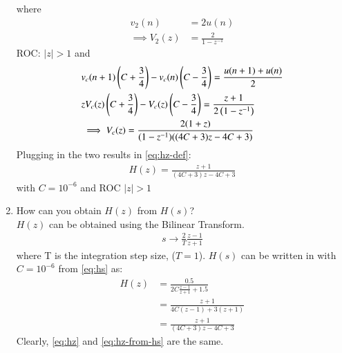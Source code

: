 \documentclass[journal,12pt,twocolumn]{IEEEtran}
\renewcommand\thesection{\arabic{section}}
\begin{document}
\begin{enumerate}[label=\arabic*.,ref=\thesection.\theenumi]
	where
	\begin{align}
	    v_2(n) &= 2u(n)\\
	    \implies V_2(z) &= \frac{2}{1-z^{-1}}
	\end{align}
	ROC: $|z|>1$
	and
	\begin{align}
	    &v_c(n+1)\left(C+\frac{3}{4}\right)-v_c(n)\left(C-\frac{3}{4}\right)= \frac{u(n+1)+u(n)}{2}\\
	    &zV_c(z)\left(C+\frac{3}{4}\right)-V_c(z)\left(C-\frac{3}{4}\right)= \frac{z+1}{2\left(1-z^{-1}\right)}\\
	    &\implies V_c(z) = \frac{2(1+z)}{(1-z^{-1})((4C+3)z-4C+3)}
	\end{align}
	Plugging in the two results in \eqref{eq:hz-def}:
\begin{align}
    H(z) =\frac{z+1}{(4C+3)z-4C+3} \label{eq:hz}
\end{align}
with $C=10^{-6}$ and ROC $|z|>1$
	\item How can you obtain $H(z)$ from $H(s)$?
	\\\solution $H(z)$ can be obtained using the Bilinear Transform.
	\begin{align}
	    s \longrightarrow \frac{2}{T}\frac{z-1}{z+1}
	\end{align}
	where T is the integration step size, ($T=1$). $H(s)$ can be written in with $C=10^{-6}$ from \eqref{eq:hs} as:
	\begin{align}
	    H(z) &= \frac{0.5}{2C\frac{z-1}{z+1}+1.5}\\
	    &= \frac{z+1}{4C(z-1)+3(z+1)}\\
	    &= \frac{z+1}{(4C+3)z-4C+3}\label{eq:hz-from-hs}
	\end{align}
	Clearly, \eqref{eq:hz} and \eqref{eq:hz-from-hs} are the same.
	\end{enumerate}
\end{document}
